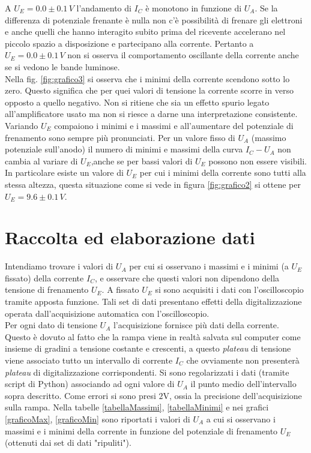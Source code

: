 \documentclass[10pt,a4paper]{article}
\begin{document}
A $U_E = 0.0 \pm0.1\, V$ l'andamento di $I_C$ è monotono in funzione di $U_A$.
Se la differenza di potenziale frenante è nulla non c'è possibilità di frenare gli elettroni e anche quelli che hanno interagito subito prima del ricevente accelerano nel piccolo spazio a disposizione e partecipano alla corrente. Pertanto a $U_E = 0.0\pm0.1\,V$ non si osserva il comportamento oscillante della corrente anche se si vedono le bande luminose.\\ 
Nella fig. \ref{fig:grafico3} si osserva che i minimi della corrente scendono sotto lo zero. Questo significa che per quei valori di tensione la corrente scorre in verso opposto a quello negativo. Non si ritiene che sia un effetto spurio legato all'amplificatore usato ma non si riesce a darne una interpretazione consistente.\\
Variando $U_E$ compaiono i minimi e i massimi e all'aumentare del potenziale di frenamento sono sempre più pronunciati. Per un valore fisso di $U_A$ (massimo potenziale sull'anodo) il numero di minimi e massimi della curva $I_C-U_A$ non cambia al variare di $U_E$,anche se per bassi valori di $U_E$ possono non essere visibili.\\

In particolare esiste un valore di $U_E$ per cui i minimi della corrente sono tutti alla stessa altezza, questa situazione come si vede in figura \ref{fig:grafico2} si ottene per $U_E = 9.6 \pm0.1 \, V$.\\

\section{Raccolta ed elaborazione dati}

Intendiamo trovare i valori di $U_A$ per cui si osservano i massimi e i minimi (a $U_E$ fissato) della corrente $I_C$, e osservare che questi valori non dipendono della tensione di frenamento $U_E$.
A fissato $U_E$ si sono acquisiti i dati con l'oscilloscopio tramite apposta funzione. Tali set di dati presentano effetti della digitalizzazione operata dall'acquisizione automatica con l'oscilloscopio.\\
Per ogni dato di tensione $U_A$ l'acquisizione fornisce più dati della corrente. Questo è dovuto al fatto che la rampa viene in realtà salvata sul computer come insieme di gradini a tensione costante e crescenti, a questo \emph{plateau} di tensione viene associato tutto un intervallo di corrente $I_C$ che ovviamente non presenterà \emph{plateau} di digitalizzazione corrispondenti. Si sono regolarizzati i dati (tramite script di Python) associando ad ogni valore di $U_A$ il punto medio dell'intervallo sopra descritto. Come errori si sono presi $2$V, ossia la precisione dell'acquisizione sulla rampa.
Nella tabelle \ref{tabellaMassimi}, \ref{tabellaMinimi} e nei grafici \ref{graficoMax}, \ref{graficoMin} sono riportati i valori di $U_A$ a cui si osservano i massimi e i minimi della corrente in funzione del potenziale di frenamento $U_E$ (ottenuti dai set di dati "ripuliti").\\
\end{document}

